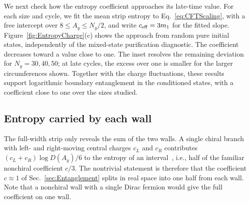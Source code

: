 \documentclass[aps,prb,10pt,twocolumn,superscriptaddress,longbibliography,floatfix]{revtex4-2}
\newcommand{\newtext}[1]{{\color{blue}#1}}
\newcommand{\claudeadd}[1]{{\color{orange}#1}}
\begin{document}
{\color{blue}
We next check how the entropy coefficient approaches its late-time value. For each size and cycle, we fit the mean strip entropy to Eq.~\eqref{eq:CFTScaling}, with a free intercept over $8\leq A_y\leq N_y/2$, and write $c_{\rm eff}=3m_1$ for the fitted slope. Figure~\ref{fig:EntropyCharge}(c) shows the approach from random pure initial states, independently of the mixed-state purification diagnostic. The coefficient decreases toward a value close to one. The inset resolves the remaining deviation for $N_y=30,40,50$; at late cycles, the excess over one is smaller for the larger circumferences shown. \claudeadd{Together with the charge fluctuations, these results support logarithmic boundary entanglement in the conditioned states, with a coefficient close to one over the sizes studied.}
}


{\color{blue}\subsection{Entropy carried by each wall}
\label{sec:ChiralCentralCharge}}

The full-width strip only reveals the sum of the two walls. A single chiral branch with left- and right-moving central charges $c_L$ and $c_R$ contributes \newtext{$(c_L+c_R)\log D(A_y)/6$} to the entropy of an interval~\cite{CalabreseCardy2004,CastroDetournayIqbalPerlmutter2014}, i.e., half of the familiar nonchiral coefficient $c/3$. The nontrivial statement is therefore that the coefficient $c\approx1$ of Sec.~\ref{sec:Entanglement} splits in real space into one half from each wall. Note that a nonchiral wall with a single Dirac fermion would give the full coefficient on one wall.
\end{document}
